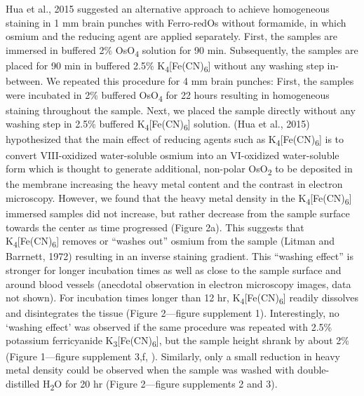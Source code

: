\documentclass{article}
\begin{document}

Hua et al., 2015 suggested an alternative approach to achieve homogeneous staining in 1 mm brain punches with Ferro-redOs without formamide, in which osmium and the reducing agent are applied separately. First, the samples are immersed in buffered 2\% OsO\textsubscript{4} solution for 90 min. Subsequently, the samples are placed for 90 min in buffered 2.5\% K\textsubscript{4}[Fe(CN)\textsubscript{6}] without any washing step in-between. We repeated this procedure for 4 mm brain punches: First, the samples were incubated in 2\% buffered OsO\textsubscript{4} for 22 hours resulting in homogeneous staining throughout the sample. Next, we placed the sample directly without any washing step in 2.5\% buffered K\textsubscript{4}[Fe(CN)\textsubscript{6}] solution. (Hua et al., 2015) hypothesized that the main effect of reducing agents such as K\textsubscript{4}[Fe(CN)\textsubscript{6}] is to convert VIII-oxidized water-soluble osmium into an VI-oxidized water-soluble form which is thought to generate additional, non-polar OsO\textsubscript{2} to be deposited in the membrane increasing the heavy metal content and the contrast in electron microscopy. However, we found that the heavy metal density in the K\textsubscript{4}[Fe(CN)\textsubscript{6}] immersed samples did not increase, but rather decrease from the sample surface towards the center as time progressed (Figure 2a). This suggests that K\textsubscript{4}[Fe(CN)\textsubscript{6}] removes or “washes out” osmium from the sample (Litman and Barrnett, 1972) resulting in an inverse staining gradient. This “washing effect” is stronger for longer incubation times as well as close to the sample surface and around blood vessels (anecdotal observation in electron microscopy images, data not shown). For incubation times longer than 12 hr, K\textsubscript{4}[Fe(CN)\textsubscript{6}] readily dissolves and disintegrates the tissue (Figure 2—figure supplement 1). Interestingly, no ‘washing effect’ was observed if the same procedure was repeated with 2.5\% potassium ferricyanide K\textsubscript{3}[Fe(CN)\textsubscript{6}], but the sample height shrank by about 2\% (Figure 1—figure supplement 3,f, ). Similarly, only a small reduction in heavy metal density could be observed when the sample was washed with double-distilled H\textsubscript{2}O for 20 hr (Figure 2—figure supplements 2 and 3).
\end{document}
